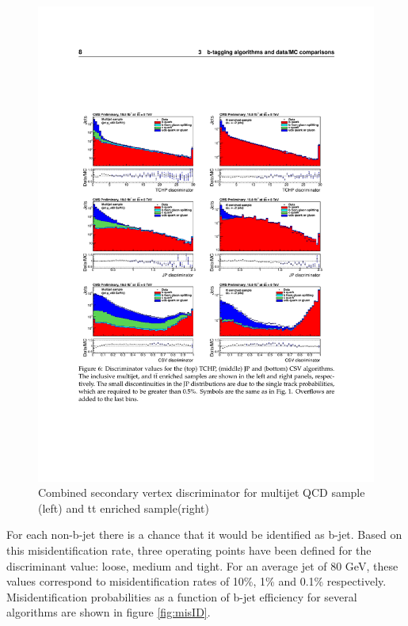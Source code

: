 \begin{figure}[ht]
	\includegraphics[width=\textwidth]{Figures/b-tag_csv.pdf}
	\caption{Combined secondary vertex discriminator for multijet QCD sample (left) and tt enriched sample(right)\cite{CMS:2013vea}}
	\label{fig:csv}
\end{figure}
For each non-b-jet there is a chance that it would be identified as b-jet. Based on this misidentification rate, three operating points have been defined for the discriminant value: loose, medium and tight. For an average jet of 80 GeV, these values correspond to misidentification rates of 10\%, 1\% and 0.1\% respectively. Misidentification probabilities as a function of b-jet efficiency for several algorithms are shown in figure \ref{fig:misID}. 
